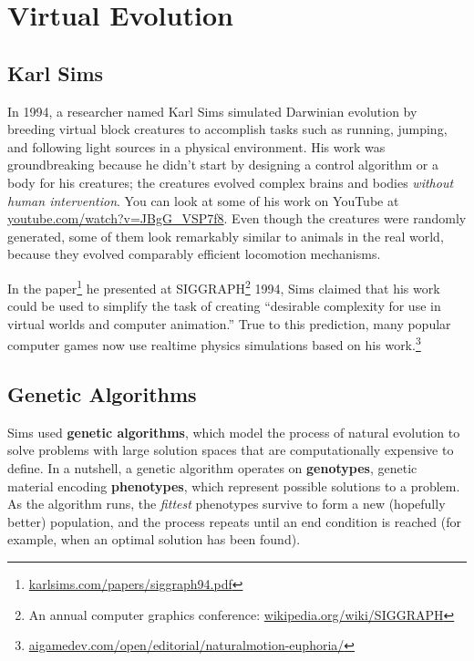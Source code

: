\documentclass[10pt]{book}
\begin{document}
\mainmatter

\newcommand{\TODO}{\hl{\emph{TODO:}}\hl}

\chapter{Virtual Evolution}

\section{Karl Sims}

In 1994, a researcher named Karl Sims simulated Darwinian evolution by breeding 
virtual block creatures to accomplish tasks such as running, jumping, and following 
light sources in a physical environment. His work was groundbreaking because he didn't 
start by designing a control algorithm or a body for his creatures; the creatures 
evolved complex brains and bodies {\em without human intervention}. You can look at 
some of his work on YouTube at \url{youtube.com/watch?v=JBgG_VSP7f8}. Even though 
the creatures were randomly generated, some of them look remarkably similar 
to animals in the real world, because they evolved comparably efficient  
locomotion mechanisms.

In the paper\footnote{\url{karlsims.com/papers/siggraph94.pdf}} he presented at SIGGRAPH\footnote{An annual computer graphics 
conference: \url{wikipedia.org/wiki/SIGGRAPH}} 1994, Sims claimed that his work could be used to simplify the task of creating
``desirable complexity for use in virtual worlds and computer animation.'' True to this prediction, many popular computer games 
now use realtime physics simulations based on his work.\footnote{\url{aigamedev.com/open/editorial/naturalmotion-euphoria/}}

\section{Genetic Algorithms}

Sims used {\bf genetic algorithms}, which model the process of natural evolution to solve  
problems with large solution spaces that are computationally expensive to define.
In a nutshell, a genetic algorithm operates on {\bf genotypes}, genetic material encoding {\bf phenotypes},
which represent possible solutions to a problem. As the algorithm runs, the {\em fittest} 
phenotypes survive to form a new (hopefully better) population, and the process
repeats until an end condition is reached (for example, when an optimal
solution has been found).  
\end{document}
